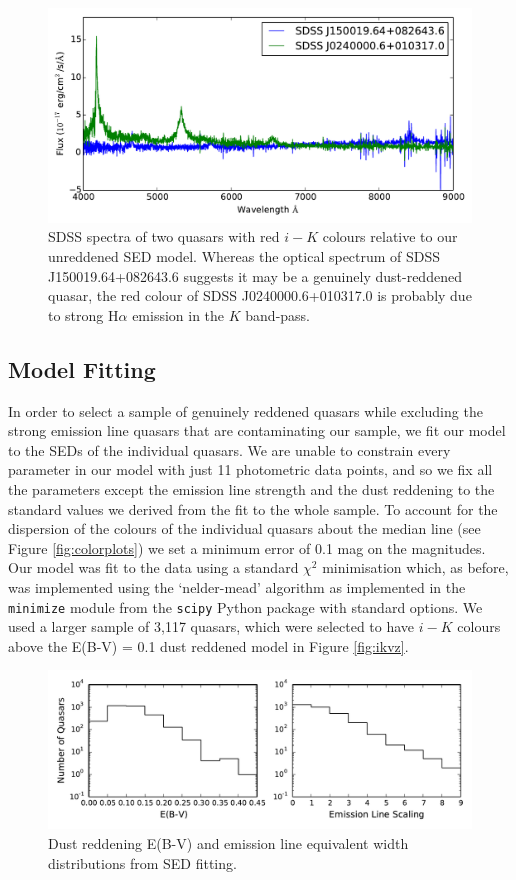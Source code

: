 \begin{figure}
  \centering
  \includegraphics[width=\textwidth]{figures/chapter06/redspectra}
  \caption{SDSS spectra of two quasars with red $i-K$ colours relative to our unreddened SED model. Whereas the optical spectrum of SDSS J150019.64+082643.6 suggests it may be a genuinely dust-reddened quasar, the red colour of SDSS J0240000.6+010317.0 is probably due to strong H$\alpha$ emission in the $K$ band-pass.}
  \label{fig:spectra}
\end{figure}

\subsection{Model Fitting}

In order to select a sample of genuinely reddened quasars while excluding the strong emission line quasars that are contaminating our sample, we fit our model to the SEDs of the individual quasars. We are unable to constrain every parameter in our model with just 11 photometric data points, and so we fix all the parameters except the emission line strength and the dust reddening to the standard values we derived from the fit to the whole sample. To account for the dispersion of the colours of the individual quasars about the median line (see Figure \ref{fig:colorplots}) we set a minimum error of 0.1 mag on the magnitudes. Our model was fit to the data using a standard $\chi^2$ minimisation which, as before, was implemented using the `nelder-mead' algorithm as implemented in the {\tt minimize} module from the {\tt scipy} Python package with standard options. We used a larger sample of 3,117 quasars, which were selected to have $i-K$ colours above the E(B-V) = 0.1 dust reddened model in Figure \ref{fig:ikvz}. 

\begin{figure}
  \centering
  \includegraphics[width=\textwidth]{figures/chapter06/ebvandelscalhist}
  \caption{Dust reddening E(B-V) and emission line equivalent width distributions from SED fitting.}
  \label{fig:ebvelscalhist}
\end{figure}

